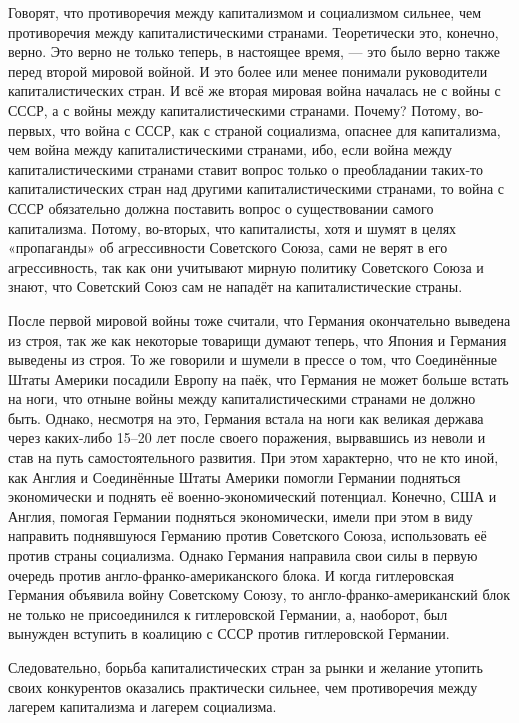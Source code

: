 \documentclass[12pt, a4paper, openany]{book}
\begin{document}
Говорят, что противоречия между капитализмом и социализмом сильнее, чем противоречия между капиталистическими странами. Теоретически это, конечно, верно. Это верно не только теперь, в настоящее время, — это было верно также перед второй мировой войной. И это более или менее понимали руководители капиталистических стран. И всё же вторая мировая война началась не с войны с СССР, а с войны между капиталистическими странами. Почему? Потому, во-первых, что война с СССР, как с страной социализма, опаснее для капитализма, чем война между капиталистическими странами, ибо, если война между капиталистическими странами ставит вопрос только о преобладании таких-то капиталистических стран над другими капиталистическими странами, то война с СССР обязательно должна поставить вопрос о существовании самого капитализма. Потому, во-вторых, что капиталисты, хотя и шумят в целях «пропаганды» об агрессивности Советского Союза, сами не верят в его агрессивность, так как они учитывают мирную политику Советского Союза и знают, что Советский Союз сам не нападёт на капиталистические страны.



После первой мировой войны тоже считали, что Германия окончательно выведена из строя, так же как некоторые товарищи думают теперь, что Япония и Германия выведены из строя. То же говорили и шумели в прессе о том, что Соединённые Штаты Америки посадили Европу на паёк, что Германия не может больше встать на ноги, что отныне войны между капиталистическими странами не должно быть. Однако, несмотря на это, Германия встала на ноги как великая держава через каких-либо 15–20 лет после своего поражения, вырвавшись из неволи и став на путь самостоятельного развития. При этом характерно, что не кто иной, как Англия и Соединённые Штаты Америки помогли Германии подняться экономически и поднять её военно-экономический потенциал. Конечно, США и Англия, помогая Германии подняться экономически, имели при этом в виду направить поднявшуюся Германию против Советского Союза, использовать её против страны социализма. Однако Германия направила свои силы в первую очередь против англо-франко-американского блока. И когда гитлеровская Германия объявила войну Советскому Союзу, то англо-франко-американский блок не только не присоединился к гитлеровской Германии, а, наоборот, был вынужден вступить в коалицию с СССР против гитлеровской Германии.



Следовательно, борьба капиталистических стран за рынки и желание утопить своих конкурентов оказались практически сильнее, чем противоречия между лагерем капитализма и лагерем социализма.
\end{document}
